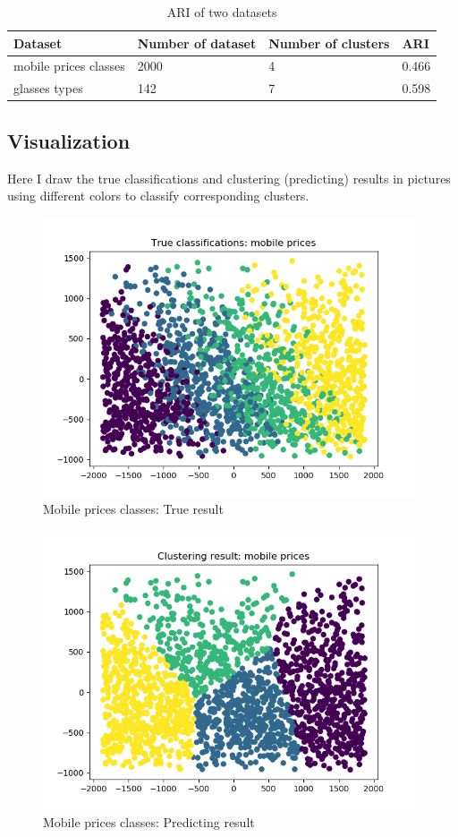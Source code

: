 \documentclass[12pt,a4paper]{article}
\begin{document}
\begin{table}
\centering
\begin{tabular}{l l l l}
\hline
\hline
Dataset & Number of dataset & Number of clusters & ARI \\[6pt]
\hline
mobile prices classes & 2000 & 4 & 0.466 \\[6pt]
\hline
glasses types & 142 & 7 & 0.598 \\[6pt]
\hline
\hline
\end{tabular}
\caption{ARI of two datasets \label{ARI result}}
\end{table}

\subsection{Visualization}
Here I draw the true classifications and clustering (predicting) results in pictures using different colors to classify corresponding clusters.

\begin{figure}
\centering
\includegraphics[width=11cm]{mobile-true}
\caption{Mobile prices classes: True result}
\label{mobile-true}
\end{figure}

\begin{figure}
\centering
\includegraphics[width=11cm]{mobile-predict}
\caption{Mobile prices classes: Predicting result}
\label{mobile-predict}
\end{figure}
\end{document}
